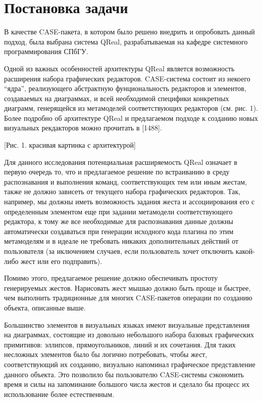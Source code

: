 \documentclass[a5paper]{article}
\begin{document}
\section{Постановка задачи}
В качестве CASE-пакета, в котором было решено внедрить и опробовать данный подход, была выбрана система QReal, разрабатываемая на кафедре 
системного программирования СПбГУ. 

Одной из важных особенностей архитектуры QReal является возможность расширения набора графических редакторов. CASE-система состоит из 
некоего ``ядра'', реализующего абстрактную фунциональность редакторов и элементов, создаваемых на диаграммах, и всей необходимой специфики 
конкретных диаграмм, генерящейся из метамоделей соответствующих редакторов (см. рис. 1). Более подробно об архитектуре QReal и предлагаемом 
подходе к  созданию новых визуальных рекдакторов можно прочитать в [1488]. 

[Рис. 1. красивая картинка с архитектурой]

Для данного исследования потенциальная расширяемость QReal означает в первую очередь то, что и предлагаемое решение по встраиванию в среду 
распознавания и выполнения команд, соответствующих тем или иным жестам, также не должно зависеть от текущего набора графических редакторов. 
Так, например, мы должны иметь возможность задания жеста и ассоциирования его с определенным элементом еще при задании метамодели 
соответствующего редактора, к тому же все 
необходимые для распознавания данные должны автоматически создаваться при генерации исходного кода плагина по этим метамоделям и в 
идеале не требовать никаких дополнительных действий от пользователя (за иключением случаев, если пользователь хочет отключить какой-либо 
жест или его подправить).

Помимо этого, предлагаемое решение должно обеспечивать простоту генерируемых жестов. Нарисовать жест мышью должно быть проще и быстрее, 
чем выполнить традиционные для многих CASE-пакетов операции по созданию объекта, описанные выше. 

Большинство элементов в визуальных языках имеют визуальные представления на диаграммах, состоящие из довольно небольшого набора базовых графических 
примитивов: эллипсов, прямоугольников, линий и их сочетания. Для таких несложных элементов было бы логично потребовать, чтобы жест, 
соответствующий их созданию, визуально напоминал графическое представление данного объекта. Это позволило бы пользователю CASE-системы 
сэкономить время и силы на запоминание большого числа жестов и сделало бы процесс их использование более естественным. 
\end{document}
